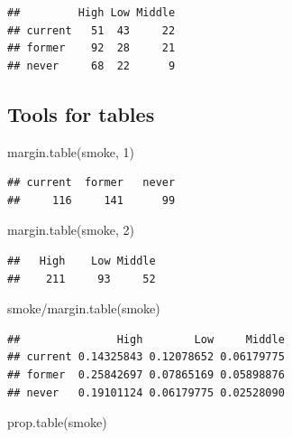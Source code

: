 \documentclass[
]{book}
\newenvironment{Shaded}{\begin{snugshade}}{\end{snugshade}}
\newcommand{\DecValTok}[1]{\textcolor[rgb]{0.00,0.00,0.81}{#1}}
\newcommand{\FunctionTok}[1]{\textcolor[rgb]{0.00,0.00,0.00}{#1}}
\newcommand{\NormalTok}[1]{#1}
\newcommand{\SpecialCharTok}[1]{\textcolor[rgb]{0.00,0.00,0.00}{#1}}
\begin{document}
\begin{verbatim}
##         High Low Middle
## current   51  43     22
## former    92  28     21
## never     68  22      9
\end{verbatim}

\hypertarget{tools-for-tables}{%
\subsection{Tools for tables}\label{tools-for-tables}}

\begin{Shaded}
\begin{Highlighting}[]
\FunctionTok{margin.table}\NormalTok{(smoke, }\DecValTok{1}\NormalTok{)}
\end{Highlighting}
\end{Shaded}

\begin{verbatim}
## current  former   never 
##     116     141      99
\end{verbatim}

\begin{Shaded}
\begin{Highlighting}[]
\FunctionTok{margin.table}\NormalTok{(smoke, }\DecValTok{2}\NormalTok{)}
\end{Highlighting}
\end{Shaded}

\begin{verbatim}
##   High    Low Middle 
##    211     93     52
\end{verbatim}

\begin{Shaded}
\begin{Highlighting}[]
\NormalTok{smoke}\SpecialCharTok{/}\FunctionTok{margin.table}\NormalTok{(smoke)}
\end{Highlighting}
\end{Shaded}

\begin{verbatim}
##               High        Low     Middle
## current 0.14325843 0.12078652 0.06179775
## former  0.25842697 0.07865169 0.05898876
## never   0.19101124 0.06179775 0.02528090
\end{verbatim}

\begin{Shaded}
\begin{Highlighting}[]
\FunctionTok{prop.table}\NormalTok{(smoke)}
\end{Highlighting}
\end{Shaded}
\end{document}
